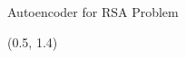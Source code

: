 \documentclass[english,aspectratio=169,dvipsnames]{beamer}
\begin{document}
\begin{frame}{Autoencoder for RSA Problem}{}
    \begin{textblock}{5}(0.5, 1.4)
        
    \end{textblock}
\end{frame}


%         

%         


\end{document}
